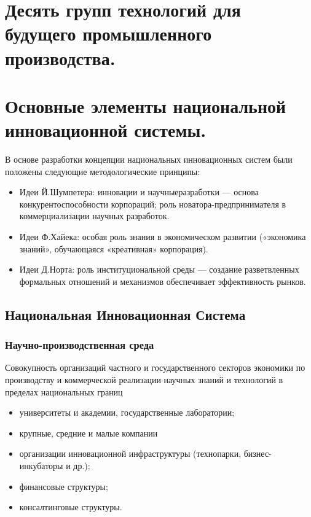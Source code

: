 \documentclass[11pt]{article}
\theoremstyle{plain} %
\theoremstyle{definition} %
\theoremstyle{remark} %
\begin{document}
\section{Десять групп технологий для будущего промышленного производства.}\label{erste}

\newpage

\section{Основные элементы национальной инновационной системы.}\label{erste}

В  основе  разработки  концепции  национальных  инновационных  систем были положены следующие методологические принципы:
\begin{itemize}
	\item Идеи Й.Шумпетера:   инновации   и   научныеразработки --– основа конкурентоспособности  корпораций;  роль  новатора-предпринимателя  в коммерциализации научных разработок.
	\item Идеи Ф.Хайека: особая  роль  знания  в  экономическом  развитии («экономика знаний», обучающаяся «креативная» корпорация).
	\item Идеи Д.Норта: роль институциональной среды --- создание разветвленных формальных  отношений  и  механизмов  обеспечивает  эффективность рынков.
\end{itemize}

\subsection{Национальная Инновационная Система}
	\subsubsection{Научно-производственная среда}
	Совокупность организаций частного и государственного секторов экономики по производству и коммерческой реализации научных знаний и технологий в пределах национальных границ
		\begin{itemize}
			\item университеты и академии, государственные лаборатории;
			\item крупные, средние и малые компании
			\item организации инновационной инфраструктуры (технопарки, бизнес-инкубаторы и др.);
			\item финансовые структуры;
			\item консалтинговые структуры.
		\end{itemize}
\end{document}
